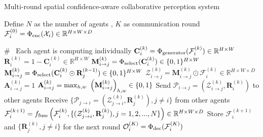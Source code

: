 \documentclass{article}
\begin{document}
\begin{algorithm}[!t]
	\caption{Multi-round spatial confidence-aware collaborative perception system} 
	\begin{algorithmic}[1]
	    \State Define $N$ as the number of agents , $K$ as communication round
	    \State {\color{blue} { \#~Initialization}}
	        \State $\mathcal{F}_{i}^{(0)}=\Phi_{\rm enc}(\mathcal{X}_i) \in \mathbb{R}^{H\times W \times D}$
	    \EndFor
	    
	          {\color{blue} { \#~ Each agent is computing individually}} 
	            \State $\mathbf{C}_{i}^{(k)} = \Phi_{\rm generator}(\mathcal{F}_{i}^{(k)})\in \mathbb{R}^{H\times W}$ 
	                \State {\color{blue} { \#~Message packing}} 
	                \State $\mathbf{R}_{i}^{(k)}=1 - \mathbf{C}_i^{(k)}\in \mathbb{R}^{H\times W}$ 
    	                \State $\mathbf{M}_{i\rightarrow j}^{(k)}=\Phi_{\rm select}(\mathbf{C}_{i}^{(k)})\in \{0, 1\}^{H\times W}$ 
    	            \Else
    	                \State $\mathbf{M}_{i\rightarrow j}^{(k)}=\Phi_{\rm select}(\mathbf{C}_{i}^{(k)}\odot \mathbf{R}_{j}^{(k-1)} ) \in \{0, 1\}^{H\times W}$ 
	                \EndIf
	                \State $\mathcal{Z}_{i\rightarrow j}^{(k)}=\mathbf{M}_{i\rightarrow j}^{(k)}\odot \mathcal{F}_i^{(k)} \in \mathbb{R}^{H\times W \times D}$
	                \State {\color{blue} { \#~Communication graph learning }}
    	                \State $\mathbf{A}_{i\rightarrow j}^{(k)}=1$ 
    	            \Else
    	                \State $\mathbf{A}_{i\rightarrow j}^{(k)}={\rm max}_{h,w}~ \left( \mathbf{M}_{i\rightarrow j}^{(k)} \right)_{h,w} \in \{0, 1\}$
    	            \EndIf
    	        \EndFor
    	        \State {\color{blue} { \#~Communication}} \State Send $\mathcal{P}_{i\rightarrow j} = \left(\mathcal{Z}_{i\rightarrow j}^{(k)},\mathbf{R}_i^{(k)} \right)$ to other agents
    	        \State Receive $\{\mathcal{P}_{j\rightarrow i}=\left(\mathcal{Z}_{j\rightarrow i}^{(k)},\mathbf{R}_j^{(k)}\right), j \neq i \}$ from other agents
    	        \State {\color{blue} { \#~Message fusion}}
	            \State $\mathcal{F}_{i}^{(k+1)}=f_{\rm fuse} \left(\mathcal{F}_{i}^{(k)},\{(\mathcal{Z}_{j\rightarrow i}^{(k)},\mathbf{R}_{j}^{(k)}), j=1,2,...,N\}\right)\in \mathbb{R}^{H\times W\times D}$ 
	       \EndFor
	       \State Store $\mathcal{F}_{i}^{(k+1)}$ and $\{\mathbf{R}_{j}^{(k)},j \neq i\}$ for the next round
	    \EndFor
    \State $\mathcal{O}_{i}^{(K)}=\Phi_{\rm dec}(\mathcal{F}_{i}^{(K)})$
	\end{algorithmic} 
	\label{alg:system}
\end{algorithm}
\end{document}
